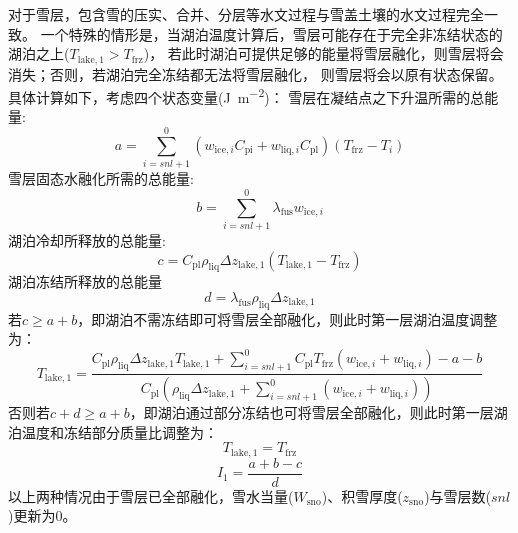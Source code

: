 对于雪层，包含雪的压实、合并、分层等水文过程与雪盖土壤的水文过程完全一致。
一个特殊的情形是，当湖泊温度计算后，雪层可能存在于完全非冻结状态的湖泊之上($T_{\mathrm{lake,1}}>T_{\mathrm {frz}} $)，
若此时湖泊可提供足够的能量将雪层融化，则雪层将会消失；否则，若湖泊完全冻结都无法将雪层融化，
则雪层将会以原有状态保留。具体计算如下，考虑四个状态变量(\unit{J.m^{-2}})：
雪层在凝结点之下升温所需的总能量:
\begin{equation}
  a=\sum_{i=s n l+1}^{0}\left(w_{\mathrm{ice},i} C_{\mathrm{p i}}+w_{\mathrm{liq},i} C_{\mathrm{p l}}\right)\left(T_{\mathrm {frz}}-T_{i}\right)
\end{equation}
雪层固态水融化所需的总能量:
\begin{equation}
  b=\sum_{i=s n l+1}^{0} \lambda_{\mathrm {fus}} w_{\mathrm{ice},i}
\end{equation}
湖泊冷却所释放的总能量:
\begin{equation}
  c=C_{\mathrm{p l}} \rho_{\mathrm{liq}} \Delta z_{\mathrm{lake, 1}}\left(T_{\mathrm{lake, 1}}-T_{\mathrm {frz}}\right)
\end{equation}
湖泊冻结所释放的总能量
\begin{equation}
  d=\lambda_{\mathrm {fus}} \rho_{\mathrm{liq}} \Delta z_{\mathrm{lake, 1}}
\end{equation}
若$c\geqslant a+b$，即湖泊不需冻结即可将雪层全部融化，则此时第一层湖泊温度调整为：
\begin{equation}
  T_{\mathrm{lake, 1}}=\frac{C_{\mathrm{p l}} \rho_{\mathrm{liq}} \Delta z_{\mathrm{lake, 1}} T_{\mathrm{lake, 1}}+\sum_{i=s n l+1}^{0} C_{\mathrm{p l}}
  T_{\mathrm {frz}}\left(w_{\mathrm{ice},i}+w_{\mathrm{liq},i}\right)-a-b}{C_{\mathrm{p l}}\left(\rho_{\mathrm{liq}} \Delta z_{\mathrm{lake, 1}}+\sum_{i=s n l+1}^{0}
  \left(w_{\mathrm{ice},i}+w_{\mathrm{liq},i}\right)\right)}
\end{equation}
否则若$c+d\geqslant a+b$，即湖泊通过部分冻结也可将雪层全部融化，则此时第一层湖泊温度和冻结部分质量比调整为：
\begin{equation}
  T_{\mathrm{lake, 1}}=T_{\mathrm {frz}}
\end{equation}
\begin{equation}
  I_{1}=\frac{a+b-c}{d}
\end{equation}
以上两种情况由于雪层已全部融化，雪水当量($W_{\mathrm{sno}}$)、积雪厚度($z_{\mathrm{sno}}$)与雪层数($snl$)更新为0。
